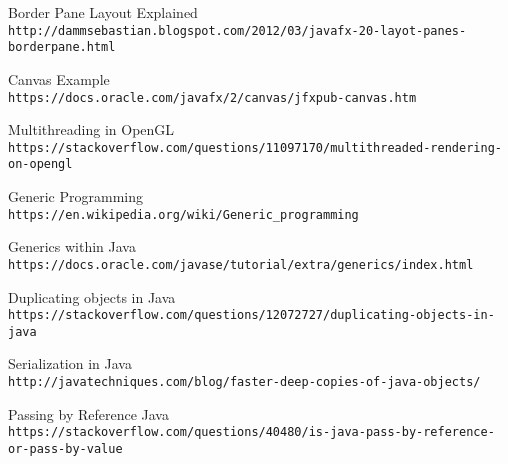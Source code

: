 \documentclass[../../main.tex]{subfiles}
\begin{document}
\begin{thebibliography}{9}
Border Pane Layout Explained\\
\texttt{http://dammsebastian.blogspot.com/2012/03/javafx-20-layot-panes-borderpane.html}

Canvas Example\\
\texttt{https://docs.oracle.com/javafx/2/canvas/jfxpub-canvas.htm}

Multithreading in OpenGL\\
\texttt{https://stackoverflow.com/questions/11097170/multithreaded-rendering-on-opengl}

Generic Programming\\
\texttt{https://en.wikipedia.org/wiki/Generic\_programming}

Generics within Java\\
\texttt{https://docs.oracle.com/javase/tutorial/extra/generics/index.html}

Duplicating objects in Java\\
\texttt{https://stackoverflow.com/questions/12072727/duplicating-objects-in-java}

Serialization in Java\\
\texttt{http://javatechniques.com/blog/faster-deep-copies-of-java-objects/}

Passing by Reference Java\\
\texttt{https://stackoverflow.com/questions/40480/is-java-pass-by-reference-or-pass-by-value}
\end{thebibliography}
\end{document}
